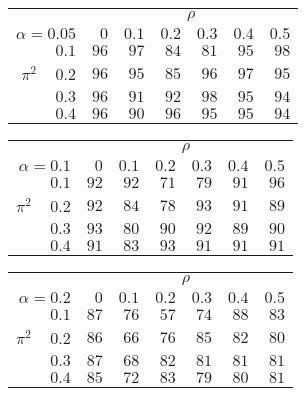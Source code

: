 \begin{tabular}{r|rrrrrr}
\hline\hline
 &\multicolumn{6}{c}{$\rho$} \\ 
 $\alpha = 0.05$ & $0$ & $0.1$ & $0.2$ & $0.3$ & $0.4$ & $0.5$ \\ 
 \hline$0.1$ & $96$ & $97$ & $84$ & $81$ & $95$ & $98$\\ 
$\pi^2\;\;\;$ $0.2$ & $96$ & $95$ & $85$ & $96$ & $97$ & $95$\\ 
$0.3$ & $96$ & $91$ & $92$ & $98$ & $95$ & $94$\\ 
$0.4$ & $96$ & $90$ & $96$ & $95$ & $95$ & $94$\\ 
 \hline 
 \end{tabular}
 
 \vspace{2em} 
 
\begin{tabular}{r|rrrrrr}
\hline\hline
 &\multicolumn{6}{c}{$\rho$} \\ 
 $\alpha = 0.1$ & $0$ & $0.1$ & $0.2$ & $0.3$ & $0.4$ & $0.5$ \\ 
 \hline$0.1$ & $92$ & $92$ & $71$ & $79$ & $91$ & $96$\\ 
$\pi^2\;\;\;$ $0.2$ & $92$ & $84$ & $78$ & $93$ & $91$ & $89$\\ 
$0.3$ & $93$ & $80$ & $90$ & $92$ & $89$ & $90$\\ 
$0.4$ & $91$ & $83$ & $93$ & $91$ & $91$ & $91$\\ 
 \hline 
 \end{tabular}
 
 \vspace{2em} 
 
\begin{tabular}{r|rrrrrr}
\hline\hline
 &\multicolumn{6}{c}{$\rho$} \\ 
 $\alpha = 0.2$ & $0$ & $0.1$ & $0.2$ & $0.3$ & $0.4$ & $0.5$ \\ 
 \hline$0.1$ & $87$ & $76$ & $57$ & $74$ & $88$ & $83$\\ 
$\pi^2\;\;\;$ $0.2$ & $86$ & $66$ & $76$ & $85$ & $82$ & $80$\\ 
$0.3$ & $87$ & $68$ & $82$ & $81$ & $81$ & $81$\\ 
$0.4$ & $85$ & $72$ & $83$ & $79$ & $80$ & $81$\\ 
 \hline 
 \end{tabular}